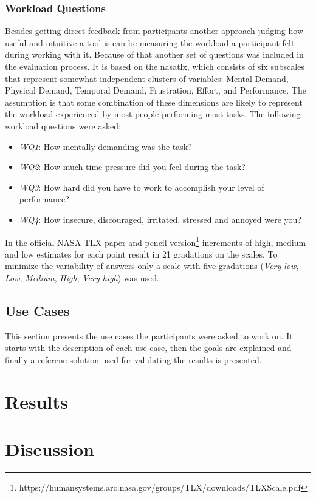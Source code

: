 \subsubsection*{Workload Questions}
Besides getting direct feedback from participants another approach judging how useful and intuitive a tool is can be measuring the workload a participant felt during working with it. Because of that another set of questions was included in the evaluation process. It is based on the \gls{nasatlx}\cite{HART1988139}, which consists of six subscales that represent somewhat independent clusters of variables: Mental Demand, Physical Demand, Temporal Demand, Frustration, Effort, and Performance. The assumption is that some combination of these dimensions are likely to represent the workload experienced by most people performing most tasks. The following workload questions were asked:
\begin{itemize}
    \item \textit{WQ1}: How mentally demanding was the task?
    \item \textit{WQ2}: How much time pressure did you feel during the task?
    \item \textit{WQ3}: How hard did you have to work to accomplish your level of performance?
    \item \textit{WQ4}: How insecure, discouraged, irritated, stressed and annoyed were you?
\end{itemize}
In the official NASA-TLX paper and pencil version\footnote{https://humansystems.arc.nasa.gov/groups/TLX/downloads/TLXScale.pdf} increments of high, medium and low estimates for each point result in 21 gradations on the scales. To minimize the variability of answers only a scale with five gradations (\textit{Very low}, \textit{Low}, \textit{Medium}, \textit{High}, \textit{Very high}) was used.

\subsection{Use Cases}
This section presents the use cases the participants were asked to work on. It starts with the description of each use case, then the goals are explained and finally a referene solution used for validating the results is presented.



\section{Results}

\section{Discussion}